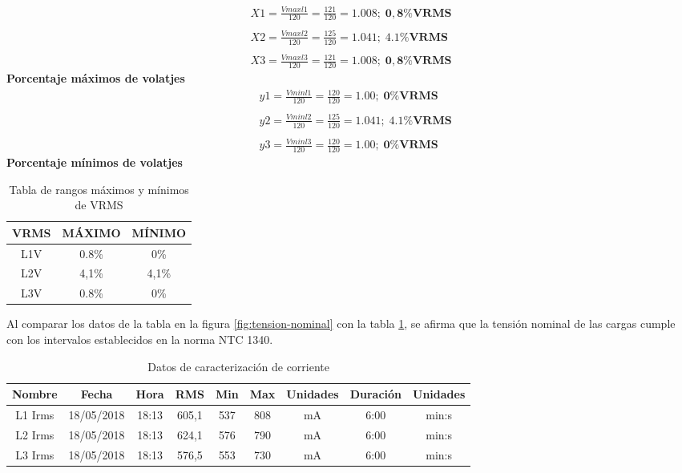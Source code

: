\begin{align*}
X1 = \frac{Vmaxl1}{120} = \frac{121}{120} = 1.008;\;\mathbf{ 0,8\% VRMS} \\\\
X2 = \frac{Vmaxl2}{120} = \frac{125}{120} = 1.041;\;\mathbf{ 4.1\% VRMS} \\\\
X3 = \frac{Vmaxl3}{120} = \frac{121}{120} = 1.008;\;\mathbf{ 0,8\% VRMS}
\end{align*}
\textbf{Porcentaje máximos de volatjes}\\
\begin{align*}
&y1 = \frac{Vminl1}{120} = \frac{120}{120} = 1.00;\;\mathbf{ 0\% VRMS} \\\\
&y2 = \frac{Vminl2}{120} = \frac{125}{120} = 1.041;\;\mathbf{ 4.1\% VRMS} \\\\
&y3 = \frac{Vminl3}{120} = \frac{120}{120} = 1.00;\;\mathbf{ 0\% VRMS}
\end{align*}
\textbf{Porcentaje mínimos de volatjes}\\

\begin{table}
\begin{center}
\begin{tabular}{ |c|c|c| } 
\hline
VRMS & MÁXIMO & MÍNIMO\\
\hline
L1V & 0.8\% & 0\%\\
\hline
L2V & 4,1\% & 4,1\%\\
\hline
L3V & 0.8\% & 0\%\\
\hline
\end{tabular}
\end{center}
\caption{Tabla de rangos máximos y mínimos de VRMS}
\label{tab:rangos-vrms}
\end{table}

Al comparar los datos de la tabla en la figura \ref{fig:tension-nominal} con la tabla \ref{tab:rangos-vrms}, se afirma que la tensión nominal de las cargas cumple con los intervalos establecidos en la norma NTC 1340.\\

\begin{table}[!htbp]
\begin{center}
\begin{tabular}{ |c|c|c|c|c|c|c|c|c| } 
\hline
Nombre & Fecha & Hora & RMS & Min & Max & Unidades & Duración & Unidades\\
\hline
L1 Irms & 18/05/2018 & 18:13 & 605,1 & 537 & 808 & mA & 6:00 & min:s\\
\hline
L2 Irms & 18/05/2018 & 18:13 & 624,1 & 576 & 790 & mA & 6:00 & min:s\\
\hline
L3 Irms & 18/05/2018 & 18:13 & 576,5 & 553 & 730 & mA & 6:00 & min:s\\
\hline
\end{tabular}
\end{center}
\caption{Datos de caracterización de corriente}
\label{tab:ejercicio-corriente}
\end{table}

